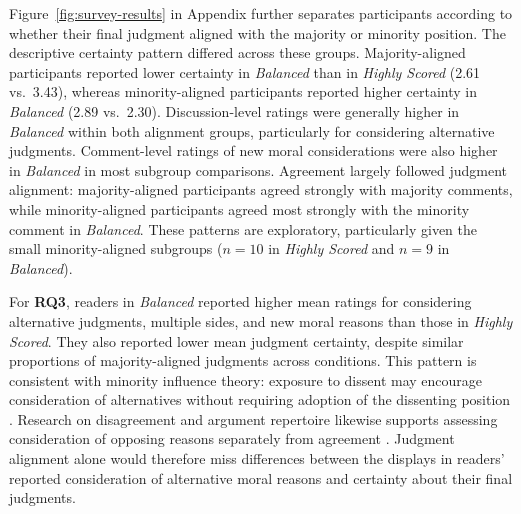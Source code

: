 Figure~\ref{fig:survey-results} in Appendix further separates participants according to whether their final judgment aligned with the majority or minority
position. 
The descriptive certainty pattern differed across these
groups. Majority-aligned participants reported lower certainty in
\textit{Balanced} than in \textit{Highly Scored} (2.61 vs.\ 3.43),
whereas minority-aligned participants reported higher certainty in
\textit{Balanced} (2.89 vs.\ 2.30).
Discussion-level ratings
were generally higher in \textit{Balanced} within both alignment groups,
particularly for considering alternative judgments. 
Comment-level ratings of new moral considerations were also higher in
\textit{Balanced} in most subgroup comparisons.
Agreement largely followed judgment
alignment: majority-aligned participants agreed strongly with majority
comments, while minority-aligned participants agreed most strongly
with the minority comment in \textit{Balanced}.
These patterns are
exploratory, particularly given the small minority-aligned subgroups
($n=10$ in \textit{Highly Scored} and $n=9$ in \textit{Balanced}).



For \textbf{RQ3}, readers in \textit{Balanced} reported higher mean ratings for
considering alternative judgments, multiple sides, and new moral
reasons than those in \textit{Highly Scored}. They also reported
lower mean judgment certainty, despite similar proportions of
majority-aligned judgments across conditions.
This pattern is consistent with minority influence theory: exposure
to dissent may encourage consideration of alternatives without
requiring adoption of the dissenting position
\cite{nemeth1986differential,nemeth1987divergent}. Research on
disagreement and argument repertoire likewise supports assessing
consideration of opposing reasons separately from agreement
\cite{price2002disagreement,cappella2002argument}. Judgment alignment
alone would therefore miss differences between the displays in
readers' reported consideration of alternative moral reasons and
certainty about their final judgments.
